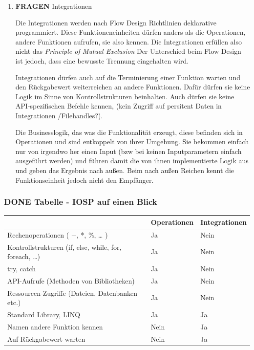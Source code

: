 \documentclass[11pt]{article}
\begin{document}
\begin{enumerate}
\item {\bfseries\sffamily FRAGEN} Integrationen
\label{sec:orgheadline37}

Die Integrationen werden nach Flow Design Richtlinien deklarative programmiert.
Diese Funktioneneinheiten dürfen anders als die Operationen, andere Funktionen aufrufen, sie also kennen.
Die Integrationen erfüllen also nicht das \emph{Principle of Mutual Exclusion}
Der Unterschied beim Flow Design ist jedoch, dass eine bewusste Trennung eingehalten wird.

Integrationen dürfen auch auf die Terminierung einer Funktion warten und den Rückgabewert  weiterreichen an andere Funktionen.
Dafür dürfen sie keine Logik im Sinne von Kontrollstrukturen beinhalten.
Auch dürfen sie keine API-spezifischen Befehle kennen, (kein Zugriff auf
persitent Daten in Integrationen /Filehandles?).

Die Businesslogik, das was die Funktionalität erzeugt, diese befinden sich in Operationen und sind entkoppelt von ihrer Umgebung.
Sie bekommen einfach nur von irgendwo her einen Input (bzw bei keinen Inputparametern einfach ausgeführt werden) und führen damit die von ihnen implementierte
Logik aus und geben das Ergebnis nach außen. Beim nach außen Reichen kennt die Funktionseinheit jedoch nicht den Empfänger.
\end{enumerate}

\subsubsection{{\bfseries\sffamily DONE} Tabelle -  IOSP auf einen Blick}
\label{sec:orgheadline39}
\begin{center}
\begin{tabular}{lll}
 & Operationen & Integrationen\\
\hline
Rechenoperationen ( +, *, \%, \ldots{} ) & Ja & Nein\\
Kontrollstrukturen (if, else, while, for, foreach, \ldots{}) & Ja & Nein\\
try, catch & Ja & Nein\\
API-Aufrufe (Methoden von Bibliotheken) & Ja & Nein\\
Ressourcen-Zugriffe (Dateien, Datenbanken etc.) & Ja & Nein\\
Standard Library, LINQ & Ja & Ja\\
Namen andere Funktion kennen & Nein & Ja\\
Auf Rückgabewert warten & Nein & Ja\\
\end{tabular}
\end{center}
\end{document}
